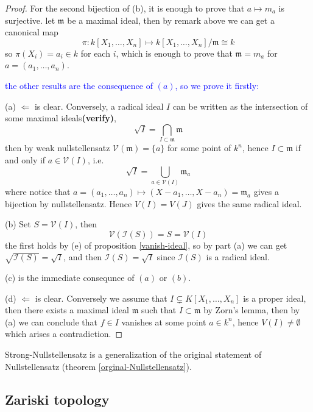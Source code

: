 \begin{proof}
    For the second bijection of (b), it is enough to prove that \(a \mapsto m_a\) is surjective. let \(\mathfrak{m}\) be a maximal ideal, then by remark above we can get a canonical map
    \[\pi : k[X_1,\dots,X_n] \mapsto k[X_1,\dots,X_n]/\mathfrak{m} \cong k\]
    so \(\pi(X_i) = a_i \in k\) for each \(i\), which is enough to prove that \(\mathfrak{m} = m_a\) for \(a = (a_1,\dots,a_n)\).

    \textcolor{blue}{the other results are the consequence of \((a)\), so we prove it firstly:}
    
    (a) \(\Leftarrow\) is clear. Conversely, a radical ideal \(I\) can be written as the intersection of some maximal ideals\textbf{(verify)},
    \[\sqrt{I} = \bigcap_{I \subset \mathfrak{m} } \mathfrak{m}\]
    then by weak nullstellensatz \(\mathcal{V}(\mathfrak{m}) = \{a\}\) for some point of \(k^n\), hence \(I \subset \mathfrak{m}\) if and only if \(a \in \mathcal{V}(I)\), i.e.
    \[\sqrt{I} = \bigcup_{a \in \mathcal{V}(I)} \mathfrak{m}_a\]
    where notice that \(a=(a_1,\dots,a_n) \mapsto (X-a_1,\dots,X-a_n) = \mathfrak{m}_a\) gives a bijection by nullstellensatz. Hence \(V(I) = V(J)\) gives the same radical ideal.

    (b) Set \(S = \mathcal{V}(I)\), then 
    \[\mathcal{V}(\mathcal{I}(S)) = S = \mathcal{V}(I)\]
    the first holds by (e) of proposition \ref{vanish-ideal}, so by part (a) we can get \(\sqrt{\mathcal{I}(S)} = \sqrt{I}\), and then  \(\mathcal{I}(S) = \sqrt{I}\) since \(\mathcal{I}(S)\) is a radical ideal.

    (c) is the immediate consequnce of \((a)\) or \((b)\).



    (d) \(\Leftarrow\) is clear. Conversely we assume that \(I \subsetneq K[X_1,\dots,X_n]\) is a proper ideal, then there exists a maximal ideal \(\mathfrak{m}\) such that \(I \subset \mathfrak{m}\) by Zorn's lemma, then by (a) we can conclude that \(f \in I\) vanishes at some point \(a \in k^n\), hence \(V(I) \neq \emptyset\) which arises a contradiction.
\end{proof}
\begin{remark}
    Strong-Nullstellensatz is a generalization of the original statement of Nullstellensatz (theorem \ref{orginal-Nullstellensatz}).
\end{remark}

\subsection{Zariski topology}

